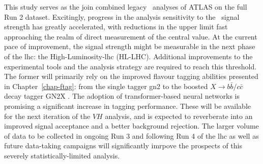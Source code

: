 This study serves as the join combined legacy \vhbc\ analyses of ATLAS on the full Run 2 dataset. Excitingly, progress in the analysis sensitivity to the \vhc\ signal strength has greatly accelerated, with reductions in the upper limit fast approaching the realm of direct measurement of the central value. At the current pace of improvement, the signal strength might be measurable in the next phase of the \gls{lhc}: the High-Luminosity-\gls{lhc} (HL-LHC). Additional improvements to the experimental tools and the analysis strategy are required to reach this threshold. The former will primarily rely on the improved flavour tagging abilities presented in Chapter~\ref{chap-ftag}: from the single tagger \gls{gn2} to the boosted $X \rightarrow b\bar{b} / c\bar{c}$ decay tagger GN2X \cite{ATL-PHYS-PUB-2023-021}. The adoption of transformer-based neural networks is promising a significant increase in tagging performance. These will be available for the next iteration of the $VH$ analysis, and is expected to reverberate into an improved signal acceptance and a better background rejection. The larger volume of data to be collected in ongoing Run 3 and following Run 4 of the \gls{lhc} as well as future data-taking campaigns will significantly imrpove the prospects of this severely statistically-limited analysis. 